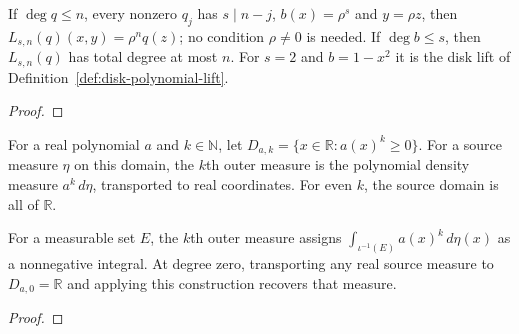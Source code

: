 \begin{supporting}
\begin{theorem}
\label{thm:scaled-lift-basic}
\leanok
If $\deg q\le n$, every nonzero $q_j$ has $s\mid n-j$, $b(x)=\rho^s$ and
$y=\rho z$, then $L_{s,n}(q)(x,y)=\rho^nq(z)$; no condition $\rho\ne0$ is
needed. If $\deg b\le s$, then $L_{s,n}(q)$ has total degree at most $n$. For
$s=2$ and $b=1-x^2$ it is the disk lift of
Definition~\ref{def:disk-polynomial-lift}.
\end{theorem}
\begin{proof}
\leanok
\end{proof}

\begin{definition}
\label{def:koornwinder-outer-measure}
\leanok
For a real polynomial $a$ and $k\in\mathbb N$, let
$D_{a,k}=\{x\in\mathbb R:a(x)^k\ge0\}$.
For a source measure $\eta$ on this domain, the $k$th outer measure is the
polynomial density measure $a^k\,d\eta$, transported to real coordinates.
For even $k$, the source domain is all of $\mathbb R$.
\end{definition}

\begin{theorem}
\label{thm:koornwinder-outer-measure}
\leanok
For a measurable set $E$, the $k$th outer measure assigns
$\int_{\iota^{-1}(E)}a(x)^k\,d\eta(x)$ as a nonnegative integral.
At degree zero, transporting any real source measure to $D_{a,0}=\mathbb R$
and applying this construction recovers that measure.
\end{theorem}
\begin{proof}
\leanok
\end{proof}


\end{supporting}
